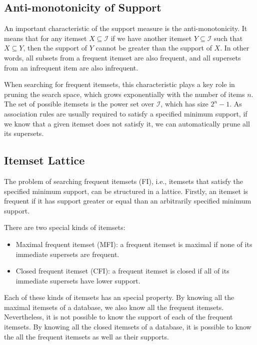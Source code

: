 \subsection{Anti-monotonicity of Support}

An important characteristic of the support measure is the anti-monotonicity. It means that for any itemset $X
\subseteq \mathcal{I}$ if we have another itemset $Y \subseteq \mathcal{I}$ such that $X \subseteq Y$, then the
support
of $Y$ cannot be greater than the support of $X$. In other words, all subsets from a frequent itemset are also
frequent,
and all supersets from an infrequent item are also infrequent.

When searching for frequent itemsets, this characteristic plays a key role in pruning the search space, which grows
exponentially with the number of items $n$. The set of possible itemsets is the power set over $\mathcal{I}$, which
has
size $2^n-1$. As association rules are usually required to satisfy a specified minimum support, if we know that a
given
itemset does not satisfy it, we can automatically prune all its supersets.

\subsection{Itemset Lattice}

The problem of searching frequent itemsets (FI), i.e., itemsets that satisfy the specified minimum support, can be
structured in a lattice. Firstly, an itemset is frequent if it has support greater or equal than an arbitrarily
specified minimum support.

There are two special kinds of itemsets:
\begin{itemize}
 \item Maximal frequent itemset (MFI): a frequent itemset is maximal if none of its immediate supersets are frequent.
 \item Closed frequent itemset (CFI): a frequent itemset is closed if all of its immediate supersets have lower
support.
\end{itemize}

Each of these kinds of itemsets has an special property. By knowing all the maximal itemsets of a database, we
also know all the frequent itemsets. Nevertheless, it is not possible to know the support of each of the frequent
itemsets. By knowing all the closed itemsets of a database, it is possible to know the all the frequent itemsets as
well as their supports.

